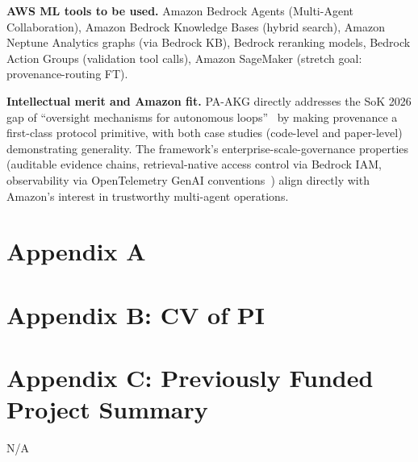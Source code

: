 \documentclass[11pt]{proposalnsf}
\begin{document}
\textbf{AWS ML tools to be used.} Amazon Bedrock Agents (Multi-Agent Collaboration), Amazon Bedrock Knowledge Bases (hybrid search), Amazon Neptune Analytics graphs (via Bedrock KB), Bedrock reranking models, Bedrock Action Groups (validation tool calls), Amazon SageMaker (stretch goal: provenance-routing FT).

\textbf{Intellectual merit and Amazon fit.} PA-AKG directly addresses the SoK 2026 gap of ``oversight mechanisms for autonomous loops''~\cite{Singh2026AgenticRAGSoK} by making provenance a first-class protocol primitive, with both case studies (code-level and paper-level) demonstrating generality. The framework's enterprise-scale-governance properties (auditable evidence chains, retrieval-native access control via Bedrock IAM, observability via OpenTelemetry GenAI conventions~\cite{OpenTelemetryGenAI2024}) align directly with Amazon's interest in trustworthy multi-agent operations.
\newpage

\appendix

\section*{Appendix A}




\newpage
\section*{Appendix B: CV of PI}



\section*{Appendix C: Previously Funded Project Summary}

N/A
\end{document}
